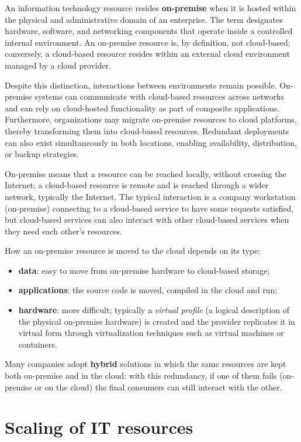 An information technology resource resides \textbf{on-premise} when it is hosted within the physical and administrative domain of an enterprise. The term designates hardware, software, and networking components that operate inside a controlled internal environment. An on-premise resource is, by definition, not cloud-based; conversely, a cloud-based resource resides within an external cloud environment managed by a cloud provider.

Despite this distinction, interactions between environments remain possible. On-premise systems can communicate with cloud-based resources across networks and can rely on cloud-hosted functionality as part of composite applications. Furthermore, organizations may migrate on-premise resources to cloud platforms, thereby transforming them into cloud-based resources. Redundant deployments can also exist simultaneously in both locations, enabling availability, distribution, or backup strategies.

On-premise means that a resource can be reached locally, without crossing the Internet; a cloud-based resource is remote and is reached through a wider network, typically the Internet. The typical interaction is a company workstation (on-premise) connecting to a cloud-based service to have some requests satisfied, but cloud-based services can also interact with other cloud-based services when they need each other's resources.

How an on-premise resource is moved to the cloud depends on its type:

\begin{itemize}
	\item \textbf{data}: easy to move from on-premise hardware to cloud-based storage;
	\item \textbf{applications}: the source code is moved, compiled in the cloud and run;
	\item \textbf{hardware}: more difficult; typically a \emph{virtual profile} (a logical description of the physical on-premise hardware) is created and the provider replicates it in virtual form through virtualization techniques such as virtual machines or containers.
\end{itemize}

Many companies adopt \textbf{hybrid} solutions in which the same resources are kept both on-premise and in the cloud: with this redundancy, if one of them fails (on-premise or on the cloud) the final consumers can still interact with the other.

\section{Scaling of IT resources}

